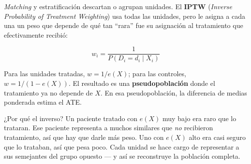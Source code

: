 \documentclass[
  letterpaper,
  DIV=11,
  numbers=noendperiod,
  oneside]{scrreprt}
\newenvironment{Shaded}{\begin{snugshade}}{\end{snugshade}}
\newcommand{\AttributeTok}[1]{\textcolor[rgb]{0.40,0.45,0.13}{#1}}
\newcommand{\CommentTok}[1]{\textcolor[rgb]{0.37,0.37,0.37}{#1}}
\newcommand{\DecValTok}[1]{\textcolor[rgb]{0.68,0.00,0.00}{#1}}
\newcommand{\FunctionTok}[1]{\textcolor[rgb]{0.28,0.35,0.67}{#1}}
\newcommand{\NormalTok}[1]{\textcolor[rgb]{0.00,0.23,0.31}{#1}}
\newcommand{\OtherTok}[1]{\textcolor[rgb]{0.00,0.23,0.31}{#1}}
\newcommand{\SpecialCharTok}[1]{\textcolor[rgb]{0.37,0.37,0.37}{#1}}
\newcommand{\StringTok}[1]{\textcolor[rgb]{0.13,0.47,0.30}{#1}}
\begin{document}
\emph{Matching} y estratificación descartan o agrupan unidades. El
\textbf{IPTW} (\emph{Inverse Probability of Treatment Weighting}) usa
todas las unidades, pero le asigna a cada una un peso que depende de qué
tan ``rara'' fue su asignación al tratamiento que efectivamente recibió:

\[w_i = \frac{1}{P(D_i = d_i \mid X_i)}\]

Para las unidades tratadas, \(w = 1/e(X)\); para las controles,
\(w = 1/(1-e(X))\). El resultado es una \textbf{pseudopoblación} donde
el tratamiento ya no depende de \(X\). En esa pseudopoblación, la
diferencia de medias ponderada estima el ATE.

¿Por qué el inverso? Un paciente tratado con \(e(X)\) muy bajo era raro
que lo trataran. Ese paciente representa a muchos similares que
\emph{no} recibieron tratamiento, así que hay que darle más peso. Uno
con \(e(X)\) alto era casi seguro que lo trataban, así que pesa poco.
Cada unidad se hace cargo de representar a sus semejantes del grupo
opuesto --- y así se reconstruye la población completa.

\begin{Shaded}
\end{Shaded}
\end{document}

